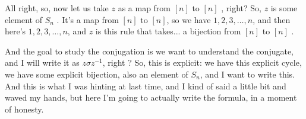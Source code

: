 \begin{speech}[00:33:35 - 00:35:00]
All right, so, now let us take $z$ as a map from $[n]$ to $[n]$ , right? So, $z$ is some element of $S_n$ . It's a map from $[n]$ to $[n]$, so we have $1, 2, 3, \dots, n$, and then here's $1, 2, 3, \dots, n$, and $z$ is this rule that takes... a bijection from $[n]$ to $[n]$ .

And the goal to study the conjugation is we want to understand the conjugate, and I will write it as $z \sigma z^{-1}$, right ? So, this is explicit: we have this explicit cycle, we have some explicit bijection, also an element of $S_n$, and I want to write this. And this is what I was hinting at last time, and I kind of said a little bit and waved my hands, but here I'm going to actually write the formula, in a moment of honesty.
\end{speech}

